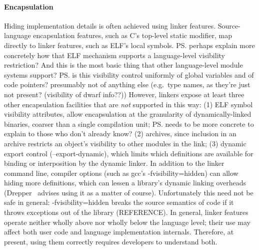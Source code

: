 \paragraph{Encapsulation}
Hiding implementation details is often achieved using linker features. 
Source-language encapsulation features,
such as C's top-level \textsf{static} modifier, 
map directly to linker features, such as ELF's local symbols.
\ps{perhaps explain more concretely how that ELF mechanism supports
a language-level visibility restriction?   And this is the most basic
thing that other language-level module systems support?}
\ps{is this visibility control uniformly of global variables and of
  code pointers?  presumably not of anything else (e.g.~type names, as
  they're just not present?  (visibility of dwarf info??))}
However, linkers expose at least three other encapsulation facilities
that are \emph{not} supported in this way: (1) ELF symbol visibility attributes,
allow encapsulation at the granularity of dynamically-linked binaries, 
coarser than a single compilation unit; 
\ps{needs to be more concrete to explain to those who don't already know?}
(2) archives,
since inclusion in an archive restricts an object's visibility 
to other modules in the link;
(3) dynamic export control (\textsf{--export-dynamic}), which limits 
which definitions are available for binding or interposition by the dynamic linker.
In addition to the linker command line, 
compiler options (such as \textsf{gcc}'s \textsf{-fvisibility=hidden})
can allow hiding more definitions,
which can lessen a library's dynamic linking overheads
(Drepper~\citet{drepper} advises using it as a matter of course).
Unfortunately this need not be safe in general: \textsf{-fvisibility=hidden}
breaks the source semantics of \Cplusplus{} code if it throws exceptions 
out of the library (REFERENCE).
In general, linker features operate neither wholly above nor wholly below the language level; 
their use may affect both user code and language implementation internals.
Therefore, at present, using them correctly requires developers to understand both.


